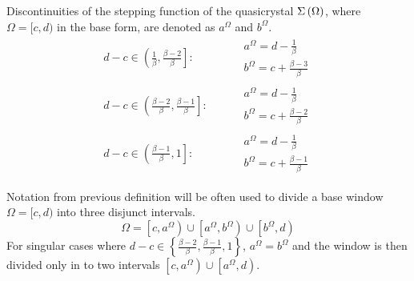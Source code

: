 \documentclass[text.tex]{subfiles}
\begin{document}
\begin{definition}
Discontinuities of the stepping function of the quasicrystal $\Sigma\left(\Omega\right)$, where $\Omega = [c,d)$ in the base form, are denoted as $a^\Omega$ and $b^\Omega$. 
\begin{align*}
d-c \in \left( \frac{1}{\beta}, \frac{\beta - 2}{\beta} \right]:& \qquad
		\begin{array}{l}
			a^\Omega = d-\frac{1}{\beta}\\[1mm]
			b^\Omega = c+\frac{\beta - 3}{\beta}
		\end{array}
\\
d-c \in \left( \frac{\beta-2}{\beta}, \frac{\beta-1}{\beta} \right]:& \qquad
		\begin{array}{l}
			a^\Omega = d-\frac{1}{\beta}\\[1mm]
			b^\Omega = c+\frac{\beta - 2}{\beta}
		\end{array}
\\
d-c \in \left( \frac{\beta-1}{\beta}, 1 \right]:& \qquad
		\begin{array}{l}
			a^\Omega = d-\frac{1}{\beta}\\[1mm]
			b^\Omega = c+\frac{\beta - 1}{\beta}
		\end{array}
\end{align*}
\end{definition}

\begin{remark}
Notation from previous definition will be often used to divide a base window $\Omega =  [c,d)$ into three disjunct intervals. 
$$\Omega = \left[c,a^\Omega\right)\cup\left[a^\Omega,b^\Omega\right)\cup\left[b^\Omega,d\right)$$
For singular cases where $d-c\in \left\{ \frac{\beta-2}{\beta}, \frac{\beta-1}{\beta}, 1 \right\}$, $a^\Omega = b^\Omega$ and the window is then divided only in to two intervals $\left[c,a^\Omega\right)\cup\left[a^\Omega,d\right)$.
\end{remark}
\end{document}
